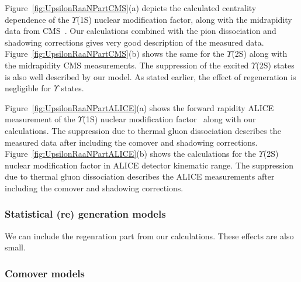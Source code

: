 {Figure~\ref{fig:UpsilonRaaNPartCMS}(a) depicts the calculated 
centrality dependence of the $\Upsilon$(1S) nuclear
modification factor, along with the midrapidity data from CMS~\cite{Sirunyan:2018nsz}.
Our calculations combined with the pion dissociation and shadowing corrections 
gives very good description of the measured data. Figure~\ref{fig:UpsilonRaaNPartCMS}(b)
shows the same for the $\Upsilon$(2S) along with the midrapidity
CMS measurements. The suppression of the excited $\Upsilon$(2S) states 
is also well described by our model. As stated earlier, the effect of regeneration is
negligible for $\Upsilon$ states. 

Figure~\ref{fig:UpsilonRaaNPartALICE}(a) shows the forward rapidity ALICE
measurement of the $\Upsilon$(1S) nuclear modification factor~\cite{ALICE:Y5TeV}
along with our calculations. The suppression due to thermal gluon dissociation 
describes the measured data after including the comover and shadowing corrections.
Figure~\ref{fig:UpsilonRaaNPartALICE}(b) shows the calculations for the
$\Upsilon$(2S) nuclear modification factor in ALICE detector kinematic range.
The suppression due to thermal gluon dissociation describes the
ALICE measurements after including the comover and shadowing corrections.


\subsubsection{Statistical (re) generation models}
{\color{red} We can include the regenration part from our calculations. These effects are also small.}



\subsubsection{Comover models}

}
